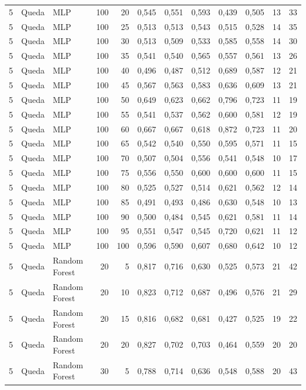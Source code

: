 \begin{longtable}{@{}rllrrrrrrrrr@{}}
5 & Queda & MLP & 100 & 20 & 0,545 & 0,551 & 0,593 & 0,439 & 0,505 & 13 & 33 \\
5 & Queda & MLP & 100 & 25 & 0,513 & 0,513 & 0,543 & 0,515 & 0,528 & 14 & 35 \\
5 & Queda & MLP & 100 & 30 & 0,513 & 0,509 & 0,533 & 0,585 & 0,558 & 14 & 30 \\
5 & Queda & MLP & 100 & 35 & 0,541 & 0,540 & 0,565 & 0,557 & 0,561 & 13 & 26 \\
5 & Queda & MLP & 100 & 40 & 0,496 & 0,487 & 0,512 & 0,689 & 0,587 & 12 & 21 \\
5 & Queda & MLP & 100 & 45 & 0,567 & 0,563 & 0,583 & 0,636 & 0,609 & 13 & 21 \\
5 & Queda & MLP & 100 & 50 & 0,649 & 0,623 & 0,662 & 0,796 & 0,723 & 11 & 19 \\
5 & Queda & MLP & 100 & 55 & 0,541 & 0,537 & 0,562 & 0,600 & 0,581 & 12 & 19 \\
5 & Queda & MLP & 100 & 60 & 0,667 & 0,667 & 0,618 & 0,872 & 0,723 & 11 & 20 \\
5 & Queda & MLP & 100 & 65 & 0,542 & 0,540 & 0,550 & 0,595 & 0,571 & 11 & 15 \\
5 & Queda & MLP & 100 & 70 & 0,507 & 0,504 & 0,556 & 0,541 & 0,548 & 10 & 17 \\
5 & Queda & MLP & 100 & 75 & 0,556 & 0,550 & 0,600 & 0,600 & 0,600 & 11 & 15 \\
5 & Queda & MLP & 100 & 80 & 0,525 & 0,527 & 0,514 & 0,621 & 0,562 & 12 & 14 \\
5 & Queda & MLP & 100 & 85 & 0,491 & 0,493 & 0,486 & 0,630 & 0,548 & 10 & 13 \\
5 & Queda & MLP & 100 & 90 & 0,500 & 0,484 & 0,545 & 0,621 & 0,581 & 11 & 14 \\
5 & Queda & MLP & 100 & 95 & 0,551 & 0,547 & 0,545 & 0,720 & 0,621 & 11 & 12 \\
5 & Queda & MLP & 100 & 100 & 0,596 & 0,590 & 0,607 & 0,680 & 0,642 & 10 & 12 \\
5 & Queda & Random Forest & 20 & 5 & 0,817 & 0,716 & 0,630 & 0,525 & 0,573 & 21 & 42 \\
5 & Queda & Random Forest & 20 & 10 & 0,823 & 0,712 & 0,687 & 0,496 & 0,576 & 21 & 29 \\
5 & Queda & Random Forest & 20 & 15 & 0,816 & 0,682 & 0,681 & 0,427 & 0,525 & 19 & 22 \\
5 & Queda & Random Forest & 20 & 20 & 0,827 & 0,702 & 0,703 & 0,464 & 0,559 & 20 & 20 \\
5 & Queda & Random Forest & 30 & 5 & 0,788 & 0,714 & 0,636 & 0,548 & 0,588 & 20 & 43 \\

\end{longtable}
